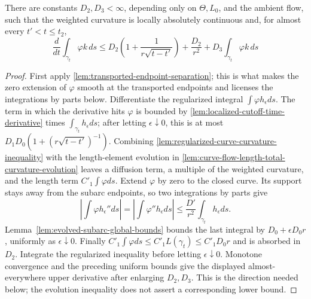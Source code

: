 \begin{theorem}
\label{lem:localized-total-curvature-evolution}
\notready
There are constants $D_2,D_3<\infty$, depending only on
$\Theta,L_0$, and the ambient flow, such that the weighted curvature is
locally absolutely continuous and, for almost every $t' < t\le t_2$,
\[
 \frac d{dt}\int_{\gamma_t}\varphi k\,ds
 \le D_2\left(1+\frac1{r\sqrt{t-t'}}\right)+\frac{D_2}{r^2}
       +D_3\int_{\gamma_t}\varphi k\,ds
\]
\end{theorem}
\begin{proof}
First apply \ref{lem:transported-endpoint-separation}; this is what makes the
zero extension of $\varphi$ smooth at the transported endpoints and licenses
the integrations by parts below.
Differentiate the regularized integral
$\int\varphi h_\epsilon ds$.  The term in which the derivative hits
$\varphi$ is bounded by \ref{lem:localized-cutoff-time-derivative} times
$\int_{\gamma_t}h_\epsilon ds$; after letting $\epsilon\downarrow0$, this
is at most $D_1D_0(1+(r\sqrt{t-t'})^{-1})$.  Combining
\ref{lem:regularized-curve-curvature-inequality} with the length-element
evolution in \ref{lem:curve-flow-length-total-curvature-evolution} leaves a
diffusion term, a multiple of the weighted curvature, and the length term
$C'_1\int\varphi ds$.  Extend $\varphi$ by zero to the closed curve.  Its
support stays away from the subarc endpoints, so two integrations by parts
give
\[
 \left|\int\varphi h_\epsilon''ds\right|
 =\left|\int\varphi''h_\epsilon ds\right|
 \le\frac{D'}{r^2}\int_{\gamma_t}h_\epsilon ds.
\]
Lemma~\ref{lem:evolved-subarc-global-bounds} bounds the last integral by
$D_0+\epsilon D_0r$, uniformly as $\epsilon\downarrow0$.  Finally
$C'_1\int\varphi ds\le C'_1L(\gamma_t)\le C'_1D_0r$ and is absorbed in
$D_2$.  Integrate the regularized inequality before letting
$\epsilon\downarrow0$.  Monotone convergence and the preceding uniform bounds
give the displayed almost-everywhere upper derivative after enlarging
$D_2,D_3$.  This is the direction needed below; the evolution inequality does
not assert a corresponding lower bound.
\end{proof}

